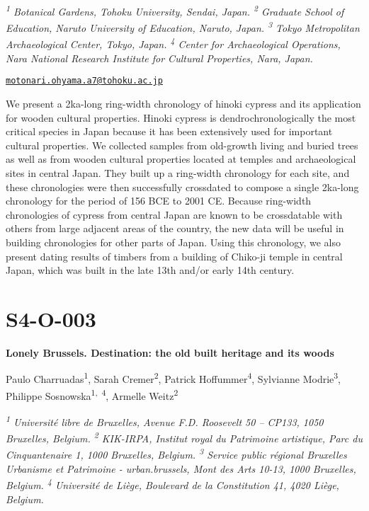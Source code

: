 \documentclass[
]{book}
\begin{document}
\emph{\textsuperscript{1} Botanical Gardens, Tohoku University, Sendai, Japan. \textsuperscript{2} Graduate School of Education, Naruto University of Education, Naruto, Japan. \textsuperscript{3} Tokyo Metropolitan Archaeological Center, Tokyo, Japan. \textsuperscript{4} Center for Archaeological Operations, Nara National Research Institute for Cultural Properties, Nara, Japan.}

\href{mailto:motonari.ohyama.a7@tohoku.ac.jp}{\nolinkurl{motonari.ohyama.a7@tohoku.ac.jp}}

We present a 2ka-long ring-width chronology of hinoki cypress and its application for wooden cultural properties. Hinoki cypress is dendrochronologically the most critical species in Japan because it has been extensively used for important cultural properties. We collected samples from old-growth living and buried trees as well as from wooden cultural properties located at temples and archaeological sites in central Japan. They built up a ring-width chronology for each site, and these chronologies were then successfully crossdated to compose a single 2ka-long chronology for the period of 156 BCE to 2001 CE. Because ring-width chronologies of cypress from central Japan are known to be crossdatable with others from large adjacent areas of the country, the new data will be useful in building chronologies for other parts of Japan. Using this chronology, we also present dating results of timbers from a building of Chiko-ji temple in central Japan, which was built in the late 13th and/or early 14th century.

\hypertarget{s4-o-003}{%
\section*{S4-O-003}\label{s4-o-003}}

\textbf{Lonely Brussels. Destination: the old built heritage and its woods}

Paulo Charruadas\textsuperscript{1}, Sarah Cremer\textsuperscript{2}, Patrick Hoffummer\textsuperscript{4}, Sylvianne Modrie\textsuperscript{3}, Philippe Sosnowska\textsuperscript{1,~4}, Armelle Weitz\textsuperscript{2}

\emph{\textsuperscript{1} Université libre de Bruxelles, Avenue F.D. Roosevelt 50 -- CP133, 1050 Bruxelles, Belgium. \textsuperscript{2} KIK-IRPA, Institut royal du Patrimoine artistique, Parc du Cinquantenaire 1, 1000 Bruxelles, Belgium. \textsuperscript{3} Service public régional Bruxelles Urbanisme et Patrimoine - urban.brussels, Mont des Arts 10-13, 1000 Bruxelles, Belgium. \textsuperscript{4} Université de Liège, Boulevard de la Constitution 41, 4020 Liège, Belgium.}
\end{document}
